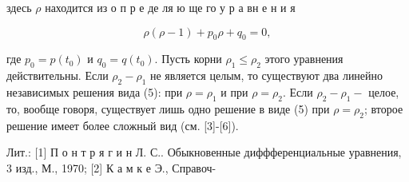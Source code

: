 \documentclass[10pt]{article}
\begin{document}
здесь $\rho$ находится из о п р е де ля ю ще го у р а вн е н и я



\[

\rho(\rho-1)+p_{0} \rho+q_{0}=0,

\]



где $p_{0}=p\left(t_{0}\right)$ и $q_{0}=q\left(t_{0}\right)$. Пусть корни $\rho_{1} \leqslant \rho_{2}$ этого уравнения действительны. Если $\rho_{2}-\rho_{1}$ не является целым, то существуют два линейно независимых решения вида (5): при $\rho=\rho_{1}$ и при $\rho=\rho_{2}$. Если $\rho_{2}-\rho_{1}-$ целое, то, вообще говоря, существует лишь одно решение в виде (5) при $\rho=\rho_{2}$; второе решение имеет более сложный вид (см. [3]-[6]).



Лит.: [1] П о н т р я г и н Л. С.. Обыкновенные диффференциальные уравнения, 3 изд., М., 1970; [2] К а м к е Э., Справоч-
\end{document}
